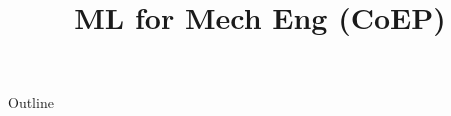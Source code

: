 \documentclass[xcolor=dvipsnames,compress,t,pdf,9pt]{beamer}
\title[\insertframenumber /\inserttotalframenumber]{ML for Mech Eng (CoEP)}
\begin{document}
	\begin{frame}
	\titlepage
	\end{frame}

	\begin{frame}{Outline}
	    \tableofcontents
	\end{frame}

	
	
	
\end{document}
